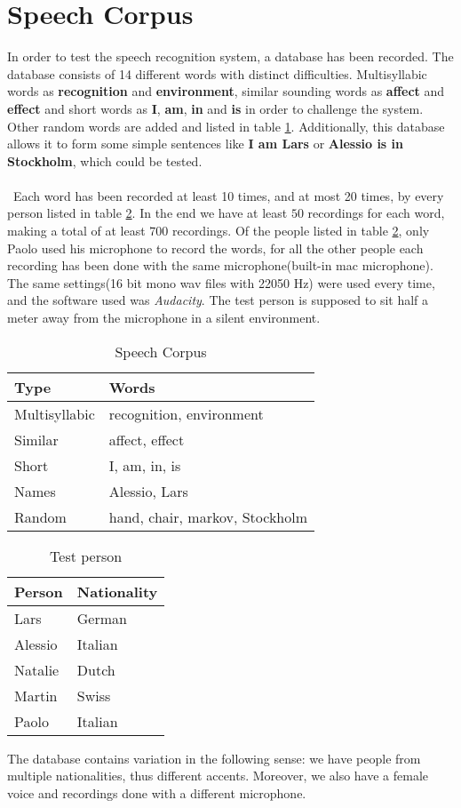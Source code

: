 \section{Speech Corpus}
In order to test the speech recognition system, a database has been recorded. The database consists of 14 different words with distinct difficulties. Multisyllabic words as \textbf{recognition} and \textbf{environment}, similar sounding words as \textbf{affect} and \textbf{effect} and short words as \textbf{I}, \textbf{am}, \textbf{in} and \textbf{is} in order to challenge the system. Other random words are added and listed in table \ref{ta:words}. Additionally, this database allows it to form some simple sentences like \textbf{I am Lars} or \textbf{Alessio is in Stockholm}, which could be tested.\\ \\\
Each word has been recorded at least 10 times, and at most 20 times, by every person listed in table \ref{ta:people}. In the end we have at least $50$ recordings for each word, making a total of at least $700$ recordings. Of the people listed in table \ref{ta:people}, only Paolo used his microphone to record the words, for all the other people each recording has been done with the same microphone(built-in mac microphone). The same settings(16 bit mono wav files with 22050 Hz) were used every time, and the software used was \textit{Audacity}. The test person is supposed to sit half a meter away from the microphone in a silent environment.
\begin{table}[ht]
\begin{tabular}{|l|l|}
\hline
\bf{Type} & \bf{Words}\\
\hline
Multisyllabic & recognition, environment\\
\hline
Similar & affect, effect\\
\hline
Short & I, am, in, is\\
\hline
Names & Alessio, Lars\\
\hline
Random & hand, chair, markov, Stockholm \\
\hline
\end{tabular}
\centering
\caption{Speech Corpus}
\label{ta:words}
\end{table}

\begin{table}[ht]
\begin{tabular}{|l|l|}
\hline
\bf{Person} & \bf{Nationality} \\
\hline
Lars & German\\
\hline
Alessio & Italian\\
\hline
Natalie & Dutch\\
\hline
Martin & Swiss\\
\hline
Paolo & Italian \\
\hline
\end{tabular}
\centering
\caption{Test person}
\label{ta:people}
\end{table}
The database contains variation in the following sense: we have people from multiple nationalities, thus different accents. Moreover, we also have a female voice and recordings done with a different microphone.
